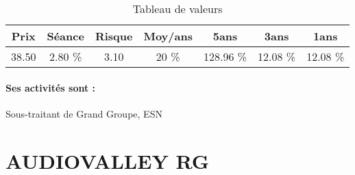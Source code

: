\documentclass[11pt,a4paper]{report}%
\begin{document}
\begin{table}[H]
  \centering
    \begin{tabular}{|c|c|c|c|c|c|c|}
    \hline
    Prix & Séance & Risque  & Moy/ans & 5ans & 3ans & 1ans \\
    \hline
    38.50 &    2.80 \%    & 3.10 & 20 \% & 128.96 \% & 12.08 \% & 12.08 \% \\
    \hline
    \end{tabular}%
        \label{tab:table_AUBAY}%
      \caption{Tableau de valeurs}
\end{table}%

\paragraph{Ses activités sont : } Sous-traitant de Grand Groupe, ESN 
    
    \newpage

\section{AUDIOVALLEY RG}
\end{document}
